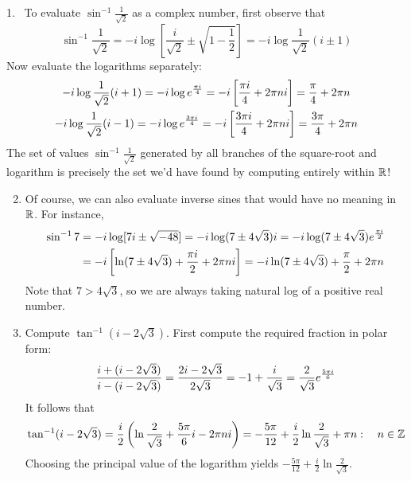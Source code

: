 \begin{examples}{}{}
\hangindent\leftmargini
\textup{1.} \ To evaluate $\sin^{-1}\frac 1{\sqrt 2}$ as a complex number, first observe that
  \[\sin^{-1}\frac 1{\sqrt 2}=-i\log\left[\frac i{\sqrt 2}\pm \sqrt{1-\frac 12}\right] =-i\log\frac 1{\sqrt 2}(i\pm 1)\]
  Now evaluate the logarithms separately:
  \begin{gather*}
  -i\log\frac 1{\sqrt 2}(i+1)=-i\log e^{\frac{\pi i}{4}}=-i\left[\frac{\pi i}4+2\pi ni\right] =\frac\pi 4+2\pi n\\
  -i\log\frac 1{\sqrt 2}(i-1)=-i\log e^{\frac{3\pi i}{4}}=-i\left[\frac{3\pi i}4+2\pi ni\right] =\frac{3\pi}4+2\pi n
  \end{gather*}
  The set of values $\sin^{-1}\frac 1{\sqrt 2}$ generated by all branches of the square-root and logarithm is precisely the set we'd have found by computing entirely within $\mathbb{R}$!
\begin{enumerate}\setcounter{enumi}{1}
  \item Of course, we can also evaluate inverse sines that would have no meaning in $\mathbb{R}$. For instance,
  \begin{align*}
  \sin^{-1}7&=-i\log[7i\pm\sqrt{-48}]=-i\log(7\pm 4\sqrt 3)i=-i\log (7\pm 4\sqrt 3)e^{\frac{\pi i}{2}}\\
  &=-i\left[\ln(7\pm 4\sqrt 3)+\frac{\pi i}2+2\pi ni\right] =-i\ln(7\pm 4\sqrt 3)+\frac\pi 2+2\pi n
  \end{align*}
  Note that $7>4\sqrt 3$, so we are always taking natural log of a positive real number.
  
  \item\label{ex:taninv} Compute $\tan^{-1}(i-2\sqrt 3)$. First compute the required fraction in polar form:
  \[\frac{i+(i-2\sqrt 3)}{i-(i-2\sqrt 3)} =\frac{2i-2\sqrt 3}{2\sqrt 3}=-1+\frac i{\sqrt 3}=\frac 2{\sqrt 3}e^{\frac{5\pi i}{6}}\]
  It follows that
  \[\tan^{-1}(i-2\sqrt 3)=\frac i2\left(\ln\frac 2{\sqrt 3}+\frac{5\pi}6i-2\pi ni\right) =-\frac{5\pi}{12}+\frac i2\ln\frac 2{\sqrt 3}+\pi n:\quad n\in\mathbb{Z}\]
  Choosing the principal value of the logarithm yields $-\frac{5\pi}{12}+\frac i2\ln\frac 2{\sqrt 3}$.
\end{enumerate}
\end{examples}
  

